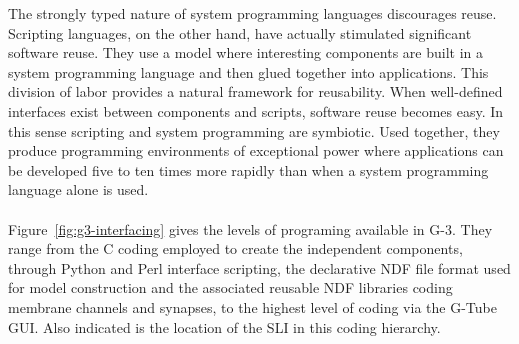 \documentclass[10pt]{article}
\begin{document}


The strongly typed nature of system programming languages discourages
reuse. Scripting languages, on the other hand, have actually
stimulated significant software reuse. They use a model where
interesting components are built in a system programming language and
then glued together into applications.
This division of labor provides a natural framework for reusability.
When well-defined interfaces exist between components and scripts, software reuse becomes easy.
In this sense scripting and system programming are symbiotic. Used
together, they produce programming environments of exceptional power where applications can be developed
five to ten times more rapidly than when a system programming language alone is used.\\

\\

Figure~\ref{fig:g3-interfacing} gives the levels of programing available in G-3. They range from the C coding employed to create the independent components, through Python and Perl interface scripting, the declarative NDF file format used for model construction and the associated reusable NDF libraries coding membrane channels and synapses, to the highest level of coding via the G-Tube GUI. Also indicated is the location of the SLI in this coding hierarchy.
\end{document}
